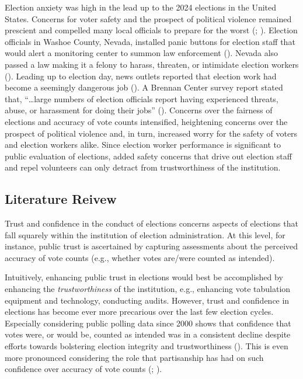 \documentclass[
  12pt,
  letterpaper,
]{article}
\begin{document}
Election anxiety was high in the lead up to the 2024 elections in the
United States. Concerns for voter safety and the prospect of political
violence remained prescient and compelled many local officials to
prepare for the worst (;
). Election officials in
Washoe County, Nevada, installed panic buttons for election staff that
would alert a monitoring center to summon law enforcement
(). Nevada also passed a law
making it a felony to harass, threaten, or intimidate election workers
(). Leading up to election day, news outlets reported that election
work had become a seemingly dangerous job (). A Brennan Center survey report stated that,
``\ldots large numbers of election officials report having experienced
threats, abuse, or harassment for doing their jobs''
(). Concerns over the
fairness of elections and accuracy of vote counts intensified,
heightening concerns over the prospect of political violence and, in
turn, increased worry for the safety of voters and election workers
alike. Since election worker performance is significant to public
evaluation of elections, added safety concerns that drive out election
staff and repel volunteers can only detract from trustworthiness of the
institution.

\subsection{Literature Reivew}\label{literature-reivew}

Trust and confidence in the conduct of elections concerns aspects of
elections that fall squarely within the institution of election
administration. At this level, for instance, public trust is ascertained
by capturing assessments about the perceived accuracy of vote counts
(e.g., whether votes are/were counted as intended).

Intuitively, enhancing public trust in elections would best be
accomplished by enhancing the \emph{trustworthiness} of the institution,
e.g., enhancing vote tabulation equipment and technology, conducting
audits. However, trust and confidence in elections has become ever more
precarious over the last few election cycles. Especially considering
public polling data since 2000 shows that confidence that votes were, or
would be, counted as intended was in a consistent decline despite
efforts towards bolstering election integrity and trustworthiness
(). This is even more
pronounced considering the role that partisanship has had on such
confidence over accuracy of vote counts
(;
).
\end{document}
